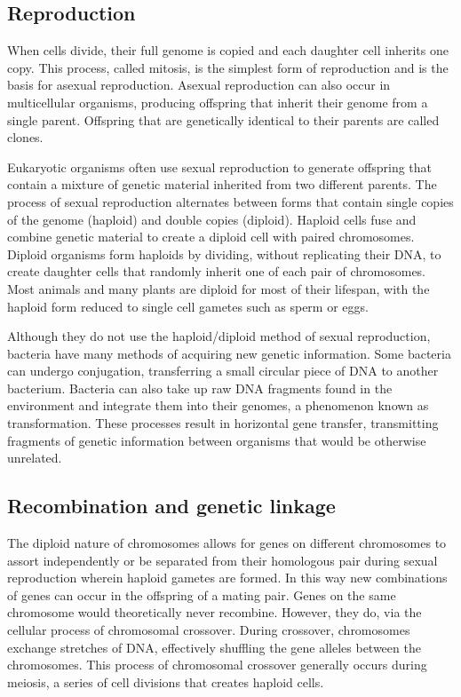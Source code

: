\hypertarget{reproduction}{%
\subsection{Reproduction}\label{reproduction}}

When cells divide, their full genome is copied and each daughter cell inherits one copy. This process, called mitosis, is the simplest form of reproduction and is the basis for asexual reproduction. Asexual reproduction can also occur in multicellular organisms, producing offspring that inherit their genome from a single parent. Offspring that are genetically identical to their parents are called clones.

Eukaryotic organisms often use sexual reproduction to generate offspring that contain a mixture of genetic material inherited from two different parents. The process of sexual reproduction alternates between forms that contain single copies of the genome (haploid) and double copies (diploid). Haploid cells fuse and combine genetic material to create a diploid cell with paired chromosomes. Diploid organisms form haploids by dividing, without replicating their DNA, to create daughter cells that randomly inherit one of each pair of chromosomes. Most animals and many plants are diploid for most of their lifespan, with the haploid form reduced to single cell gametes such as sperm or eggs.

Although they do not use the haploid/diploid method of sexual reproduction, bacteria have many methods of acquiring new genetic information. Some bacteria can undergo conjugation, transferring a small circular piece of DNA to another bacterium. Bacteria can also take up raw DNA fragments found in the environment and integrate them into their genomes, a phenomenon known as transformation. These processes result in horizontal gene transfer, transmitting fragments of genetic information between organisms that would be otherwise unrelated.

\hypertarget{recombination-and-genetic-linkage}{%
\subsection{Recombination and genetic linkage}\label{recombination-and-genetic-linkage}}

The diploid nature of chromosomes allows for genes on different chromosomes to assort independently or be separated from their homologous pair during sexual reproduction wherein haploid gametes are formed. In this way new combinations of genes can occur in the offspring of a mating pair. Genes on the same chromosome would theoretically never recombine. However, they do, via the cellular process of chromosomal crossover. During crossover, chromosomes exchange stretches of DNA, effectively shuffling the gene alleles between the chromosomes. This process of chromosomal crossover generally occurs during meiosis, a series of cell divisions that creates haploid cells.



